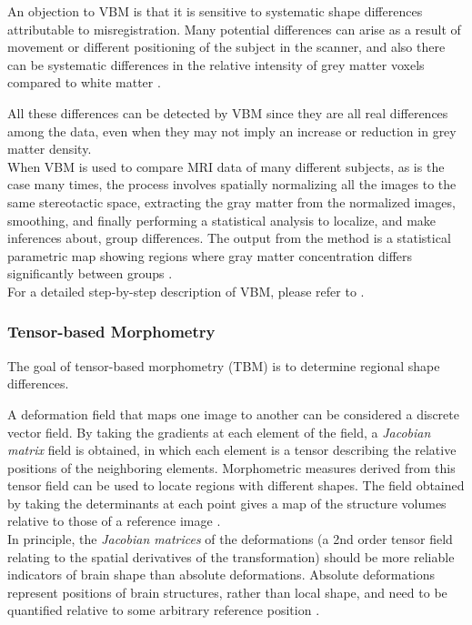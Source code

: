 An objection to VBM is that it is sensitive to systematic shape
differences attributable to misregistration. Many potential
differences can arise as a result of movement or different positioning
of the subject in the scanner, and also there can be systematic
differences in the relative intensity of grey matter voxels compared
to white matter \cite{ashburner}.

All these differences can be detected by VBM since they are all real
differences among the data, even when they may not imply an increase
or reduction in grey matter density.\\

When VBM is used to compare MRI data of many different subjects, as is
the case many times, the process involves spatially normalizing all
the images to the same stereotactic space, extracting the gray matter
from the normalized images, smoothing, and finally performing a
statistical analysis to localize, and make inferences about, group
differences. The output from the method is a statistical parametric
map showing regions where gray matter concentration differs
significantly between groups \cite{ashburner2}.\\


For a detailed step-by-step description of VBM, please refer to
\cite{ashburner2}.

\subsubsection{Tensor-based Morphometry}
The goal of tensor-based morphometry (TBM) is to determine regional
shape differences. 

A deformation field that maps one image to another can be considered a
discrete vector field. By taking the gradients at each element of the
field, a \textit{Jacobian matrix} field is obtained, in which each element is a
tensor describing the relative positions of the neighboring
elements. Morphometric measures derived from this tensor field can be
used to locate regions with different shapes. The field obtained by
taking the determinants at each point gives a map of the structure
volumes relative to those of a reference image \cite{ashburner2}.\\

In principle, the \textit{Jacobian matrices} of the deformations (a
2nd order tensor field relating to the spatial derivatives of the
transformation) should be more reliable indicators of brain shape than
absolute deformations. Absolute deformations represent positions of
brain structures, rather than local shape, and need to be quantified
relative to some arbitrary reference position \cite{ashburner}.\\

